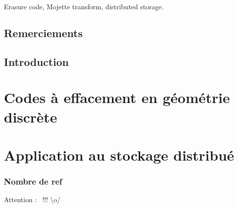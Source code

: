 \begin{keywords}
    Erasure code, Mojette transform, distributed storage.
\end{keywords}

\maketitle

\chapter*{Remerciements}

\lipsum[1-2]

\newpage

\dominitoc
\tableofcontents

\chapter{Introduction}



\part{Codes à effacement en géométrie discrète}







\part{Application au stockage distribué}







\printbibliography[
]



\section*{Nombre de ref}
Attention : \ !!! \textbackslash{}o/

\backmatter


